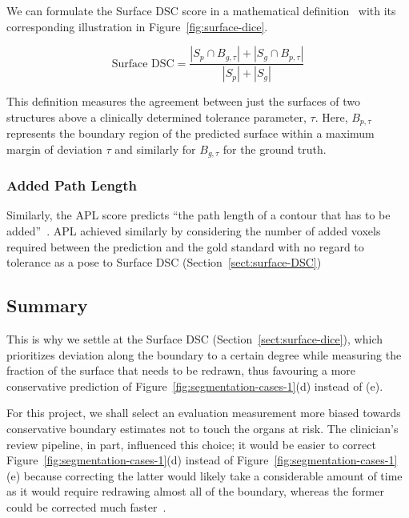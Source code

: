 \documentclass[12pt,twoside]{report}
\begin{document}
We can formulate the Surface DSC score in a mathematical definition~\cite{Sherer2021-le} with its corresponding illustration in Figure~\ref{fig:surface-dice}.

\begin{equation*}
 \text{Surface DSC} = \frac{|S_p \cap B_{g,\tau}| + |S_g \cap B_{p,\tau}|}{|S_p| + |S_g|}
\end{equation*}

This definition measures the agreement between just the surfaces of two structures above a clinically determined tolerance parameter, $\tau$. Here, $B_{p,\tau}$ represents the boundary region of the predicted surface within a maximum margin of deviation $\tau$ and similarly for $B_{g,\tau}$ for the ground truth.

\subsubsection{Added Path Length}

Similarly, the APL score predicts ``the path length of a contour that has to be added''~\cite{APL}. APL achieved similarly by considering the number of added voxels required between the prediction and the gold standard with no regard to tolerance as a pose to Surface DSC (Section~\ref{sect:surface-DSC})



\subsection{Summary}

This is why we settle at the Surface DSC (Section~\ref{sect:surface-dice}), which prioritizes deviation along the boundary to a certain degree while measuring the fraction of the surface that needs to be redrawn, thus favouring a more conservative prediction of Figure~\ref{fig:segmentation-cases-1}(d) instead of (e).

For this project, we shall select an evaluation measurement more biased towards conservative boundary estimates not to touch the organs at risk. The clinician's review pipeline, in part, influenced this choice; it would be easier to correct Figure~\ref{fig:segmentation-cases-1}(d) instead of Figure~\ref{fig:segmentation-cases-1}(e) because correcting the latter would likely take a considerable amount of time as it would require redrawing almost all of the boundary, whereas the former could be corrected much faster~\cite{Nikolov2021-xe}.
\end{document}
